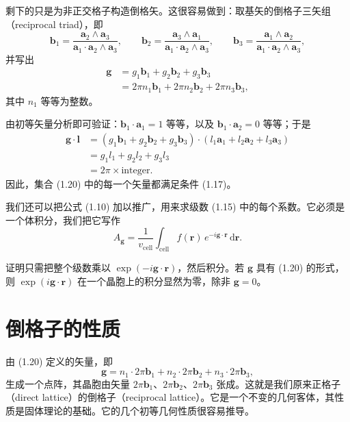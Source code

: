 剩下的只是为非正交格子构造倒格矢。这很容易做到：取基矢的倒格子三矢组（reciprocal triad），即
\begin{equation*}
\mathbf{b}_1 = \frac{\mathbf{a}_2\wedge\mathbf{a}_3}{\mathbf{a}_1\cdot\mathbf{a}_2\wedge\mathbf{a}_3}, \qquad
\mathbf{b}_2 = \frac{\mathbf{a}_3\wedge\mathbf{a}_1}{\mathbf{a}_1\cdot\mathbf{a}_2\wedge\mathbf{a}_3}, \qquad
\mathbf{b}_3 = \frac{\mathbf{a}_1\wedge\mathbf{a}_2}{\mathbf{a}_1\cdot\mathbf{a}_2\wedge\mathbf{a}_3},
\tag{1.19}
\end{equation*}
并写出
\begin{align*}
\boldsymbol{g} &= g_1\mathbf{b}_1 + g_2\mathbf{b}_2 + g_3\mathbf{b}_3 \\
&= 2\pi n_1\mathbf{b}_1 + 2\pi n_2\mathbf{b}_2 + 2\pi n_3\mathbf{b}_3,
\tag{1.20}
\end{align*}
其中 $n_1$ 等等为整数。

由初等矢量分析即可验证：$\mathbf{b}_1\cdot\mathbf{a}_1 = 1$ 等等，以及 $\mathbf{b}_1\cdot\mathbf{a}_2 = 0$ 等等；于是
\begin{align*}
\boldsymbol{g}\cdot\boldsymbol{l} &= \left(g_1\mathbf{b}_1 + g_2\mathbf{b}_2 + g_3\mathbf{b}_3\right)\cdot\left(l_1\mathbf{a}_1 + l_2\mathbf{a}_2 + l_3\mathbf{a}_3\right) \\
&= g_1 l_1 + g_2 l_2 + g_3 l_3 \\
&= 2\pi \times \text{integer}.
\tag{1.21}
\end{align*}
因此，集合 (1.20) 中的每一个矢量都满足条件 (1.17)。

我们还可以把公式 (1.10) 加以推广，用来求级数 (1.15) 中的每个系数。它必须是一个体积分，我们把它写作
\begin{equation*}
A_{\boldsymbol{g}} = \frac{1}{v_{\text{cell}}} \int_{\text{cell}} f(\mathbf{r})\, e^{-i\boldsymbol{g}\cdot\mathbf{r}}\,\mathrm{d}\mathbf{r}.
\tag{1.22}
\end{equation*}

证明只需把整个级数乘以 $\exp(-i\boldsymbol{g}\cdot\mathbf{r})$，然后积分。若 $\boldsymbol{g}$ 具有 (1.20) 的形式，则 $\exp(i\boldsymbol{g}\cdot\mathbf{r})$ 在一个晶胞上的积分显然为零，除非 $\boldsymbol{g}=0$。

\section{倒格子的性质}

由 (1.20) 定义的矢量，即
\begin{equation*}
\boldsymbol{g} = n_1\cdot 2\pi\mathbf{b}_1 + n_2\cdot 2\pi\mathbf{b}_2 + n_3\cdot 2\pi\mathbf{b}_3,
\tag{1.23}
\end{equation*}
生成一个点阵，其晶胞由矢量 $2\pi\mathbf{b}_1$、$2\pi\mathbf{b}_2$、$2\pi\mathbf{b}_3$ 张成。这就是我们原来正格子（direct lattice）的倒格子（reciprocal lattice）。它是一个不变的几何客体，其性质是固体理论的基础。它的几个初等几何性质很容易推导。

